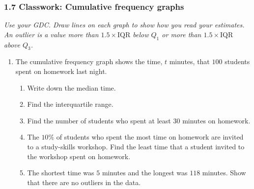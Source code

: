 \documentclass[12pt, twoside]{article}
\begin{document}
\subsubsection*{1.7 Classwork: Cumulative frequency graphs}

\emph{Use your GDC. Draw lines on each graph to show how you read your
estimates. An outlier is a value more than $1.5 \times \text{IQR}$ below
$Q_{1}$ or more than $1.5 \times \text{IQR}$ above $Q_{3}$.}

\begin{enumerate}[itemsep=0.15cm]

\item[1.]

The cumulative frequency graph shows the time, $t$ minutes, that $100$
students spent on homework last night.

\begin{center}
\end{center}

\begin{enumerate}[itemsep=0.02cm]
  \item Write down the median time.
  \item Find the interquartile range.
  \item Find the number of students who spent at least $30$ minutes on
  homework.
  \item The $10\%$ of students who spent the most time on homework are
  invited to a study-skills workshop. Find the least time that a student
  invited to the workshop spent on homework.
  \item The shortest time was $5$ minutes and the longest was $118$
  minutes. Show that there are no outliers in the data.
\end{enumerate}


\end{enumerate}
\end{document}

